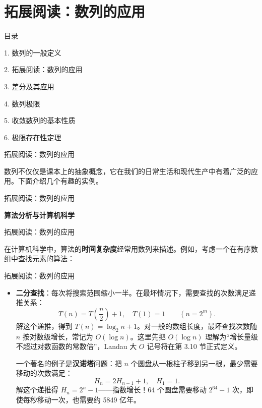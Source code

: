 \documentclass[aspectratio=169,10pt,fontset=fandol]{ctexbeamer}
\begin{document}
\section{拓展阅读：数列的应用}
\begin{frame}[t,fragile]{目录}
\normalsize
{\color{black}\normalsize 1. 数列的一般定义\par}\vspace{0.3em}
{\color{blue}\normalsize 2. 拓展阅读：数列的应用\par}\vspace{0.3em}
{\color{gray!40}\normalsize 3. 差分及其应用\par}\vspace{0.3em}
{\color{gray!40}\normalsize 4. 数列极限\par}\vspace{0.3em}
{\color{gray!40}\normalsize 5. 收敛数列的基本性质\par}\vspace{0.3em}
{\color{gray!40}\normalsize 6. 极限存在性定理\par}\vspace{0.3em}
\end{frame}
\begin{frame}[t,fragile]{拓展阅读：数列的应用}
\footnotesize
{\footnotesize
数列不仅仅是课本上的抽象概念，它在我们的日常生活和现代生产中有着广泛的应用。下面介绍几个有趣的实例。


}
\end{frame}
\begin{frame}[t,fragile]{拓展阅读：数列的应用}
\footnotesize
{\footnotesize
\textbf{算法分析与计算机科学}


}
\end{frame}
\begin{frame}[t,fragile]{拓展阅读：数列的应用}
\footnotesize
{\footnotesize
在计算机科学中，算法的\textbf{时间复杂度}经常用数列来描述。例如，考虑一个在有序数组中查找元素的算法：


}
\end{frame}
\begin{frame}[t,fragile]{拓展阅读：数列的应用}
\footnotesize
{\footnotesize
\begin{itemize}
\item \textbf{二分查找}：每次将搜索范围缩小一半。在最坏情况下，需要查找的次数满足递推关系：
\[
T(n) = T\left(\dfrac{n}{2}\right) + 1,\quad T(1) = 1\qquad(n=2^m).
\]
解这个递推，得到 \(T(n)=\log_2 n+1\)。对一般的数组长度，最坏查找次数随 $n$ 按对数级增长，常记为 \(O(\log n)\)。这里先把 \(O(\log n)\) 理解为“增长量级不超过对数函数的常数倍”，Landau 大 \(O\) 记号将在第 3.10 节正式定义。


一个著名的例子是\textbf{汉诺塔}问题：把 \(n\) 个圆盘从一根柱子移到另一根，最少需要移动的次数满足：
\[
H_n = 2H_{n-1} + 1,\quad H_1 = 1.
\]
解这个递推得 \(H_n = 2^n - 1\)——指数增长！64 个圆盘需要移动 \(2^{64}-1\) 次，即使每秒移动一次，也需要约 5849 亿年。
\end{itemize}
}
\end{frame}
\end{document}
